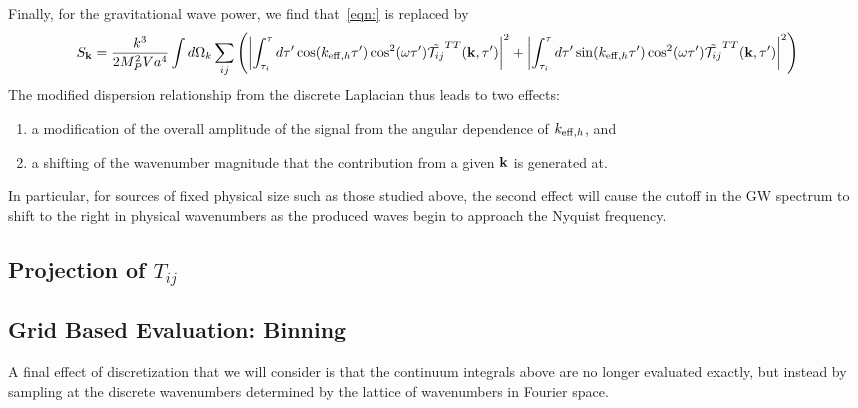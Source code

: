 \documentclass{revtex4}
\begin{document}
Finally, for the gravitational wave power, we find that~\eqref{eqn:} is replaced by
\begin{equation}
  S_{\bf k} = \frac{k^3}{2M_P^2Va^4}\int d\Omega_k\sum_{ij}\left(\left|\int_{\tau_i}^\tau d\tau'\cos(k_{{\rm eff},h}\tau')\cos^2(\omega \tau')\tilde{\mathcal{T}_{ij}}^{TT}({\bf k},\tau')\right|^2 + \left|\int_{\tau_i}^\tau d\tau'\sin(k_{{\rm eff},h}\tau')\cos^2(\omega \tau')\tilde{\mathcal{T}_{ij}}^{TT}({\bf k},\tau')\right|^2 \right)
\end{equation}
The modified dispersion relationship from the discrete Laplacian thus leads to two effects:
\begin{enumerate}
\item a modification of the overall amplitude of the signal from the angular dependence of $k_{{\rm eff},h}$, and
\item a shifting of the wavenumber magnitude that the contribution from a given ${\bf k}$ is generated at.
\end{enumerate}
In particular, for sources of fixed physical size such as those studied above, the second effect will cause the cutoff in the GW spectrum to shift to the right in physical wavenumbers as the produced waves begin to approach the Nyquist frequency.


\subsection{Projection of $T_{ij}$}

\subsection{Grid Based Evaluation: Binning}
A final effect of discretization that we will consider is that the continuum integrals above are no longer evaluated exactly, but instead by sampling at the discrete wavenumbers determined by the lattice of wavenumbers in Fourier space.
\end{document}
